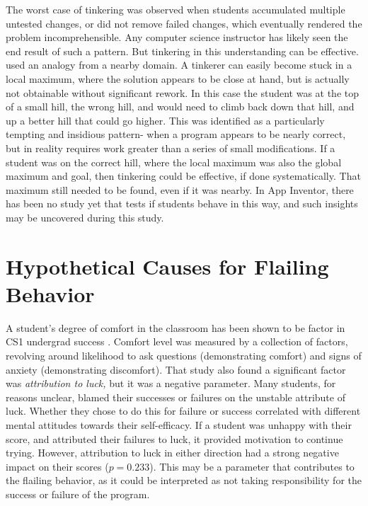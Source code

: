 The worst case of tinkering was observed when students accumulated multiple untested changes, or did not remove failed changes, which eventually rendered the problem incomprehensible. Any computer science instructor has likely seen the end result of such a pattern. But tinkering in this understanding can be effective. \citeauthor{perkins-1986} used an analogy from a nearby domain. A tinkerer can easily become stuck in a local maximum, where the solution appears to be close at hand, but is actually not obtainable without significant rework. In this case the student was at the top of a small hill, the wrong hill, and would need to climb back down that hill, and up a better hill that could go higher. This was identified as a particularly tempting and insidious pattern- when a program appears to be nearly correct, but in reality requires work greater than a series of small modifications. If a student was on the correct hill, where the local maximum was also the global maximum and goal, then tinkering could be effective, if done systematically. That maximum still needed to be found, even if it was nearby. In App Inventor, there has been no study yet that tests if students behave in this way, and such insights may be uncovered during this study.



\section{Hypothetical Causes for Flailing Behavior}

A student's degree of comfort in the classroom has been shown to be factor in CS1 undergrad success \citep{wilson-2002}. Comfort level was measured by a collection of factors, revolving around likelihood to ask questions (demonstrating comfort) and signs of anxiety (demonstrating discomfort). That study also found a significant factor was \emph{attribution to luck,} but it was a negative parameter. Many students, for reasons unclear, blamed their successes or failures on the unstable attribute of luck. Whether they chose to do this for failure or success correlated with different mental attitudes towards their self-efficacy. If a student was unhappy with their score, and attributed their failures to luck, it provided motivation to continue trying. However, attribution to luck in either direction had a strong negative impact on their scores ($p=0.233$). This may be a parameter that contributes to the flailing behavior, as it could be interpreted as not taking responsibility for the success or failure of the program. 


